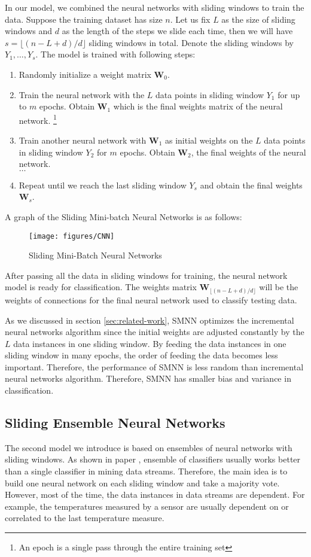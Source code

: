 \documentclass[conference]{IEEEtran}
\begin{document}
		
		In our model, we combined the neural networks with sliding windows to train the data. Suppose the training dataset has size $n$. Let us fix $L$ as the size of sliding windows and $d$ as the length of the steps we slide each time, then we will have $s = \lfloor(n-L+d) / d\rfloor$ sliding windows in total. Denote the sliding windows by $Y_1, \ldots, Y_s$.  The model is trained with following steps: 
		\begin{enumerate}
			\item Randomly initialize a weight matrix $\textbf{W}_0$.
			\item Train the neural network with the $L$ data points in sliding window $Y_1$ for up to $m$ epochs. Obtain $\textbf{W}_1$ which is the final weights matrix of the neural network.
			\footnote{An epoch is a single pass through the entire training set} 
			\item Train another neural network with $\textbf{W}_1$ as initial weights on the $L$ data points in sliding window $Y_2$ for $m$ epochs. Obtain $\textbf{W}_2$, the final weights of the neural network.\\
			$\ldots$
			\item Repeat until we reach the last sliding window $Y_s$ and obtain the final weights $\textbf{W}_{s}$.
		\end{enumerate}
		A graph of the Sliding Mini-batch Neural Networks is as follows:
		\begin{figure}[H]
			\centering
			\texttt{[image: figures/CNN]}
			\caption{Sliding Mini-Batch Neural Networks}
			\label{fig:minibatchANN}
		\end{figure}
		After passing all the data in sliding windows for training, the neural network model is ready for classification. The weights matrix $\textbf{W}_{\lfloor(n-L+d) / d\rfloor}$ will be the weights of connections for the final neural network used to classify testing data.
		
		As we discussed in section \ref{sec:related-work}, SMNN optimizes the incremental neural networks algorithm since the initial weights are adjusted constantly by the $L$ data instances in one sliding window. By feeding the data instances in one sliding window in many epochs, the order of feeding the data becomes less important. Therefore, the performance of SMNN is less random than incremental neural networks algorithm. Therefore, SMNN has smaller bias and variance in classification.
		
		
		\subsection{Sliding Ensemble Neural Networks}
		\label{sec:senn}
		The second model we introduce is based on ensembles of neural networks with sliding windows. As shown in paper \cite{ensemble1}, ensemble of classifiers usually works better than a single classifier in mining data streams. Therefore, the main idea is to build one neural network on each sliding window and take a majority vote. However, most of the time, the data instances in data streams are dependent. For example, the temperatures measured by a sensor are usually dependent on or correlated to the last temperature measure.
		
\end{document}
